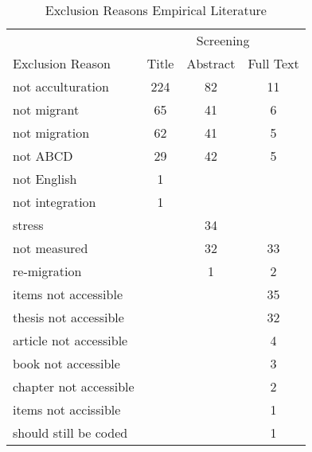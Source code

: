\begin{table}
\begin{minipage}[t][\textheight][t]{\textwidth}

\caption{\label{tab:EmpiricalExclusion}Exclusion Reasons Empirical Literature}
\begin{tabular}[t]{lccc}
\toprule
\multicolumn{1}{c}{ } & \multicolumn{3}{c}{Screening} \\
\cmidrule(l{3pt}r{3pt}){2-4}
Exclusion Reason & Title & Abstract & Full Text\\
\midrule
not acculturation & 224 & 82 & 11\\
not migrant & 65 & 41 & 6\\
not migration & 62 & 41 & 5\\
not ABCD & 29 & 42 & 5\\
not English & 1 &  & \\
not integration & 1 &  & \\
stress &  & 34 & \\
not measured &  & 32 & 33\\
re-migration &  & 1 & 2\\
items not accessible &  &  & 35\\
thesis not accessible &  &  & 32\\
article not accessible &  &  & 4\\
book not accessible &  &  & 3\\
chapter not accessible &  &  & 2\\
items not accissible &  &  & 1\\
should still be coded &  &  & 1\\
\bottomrule
\end{tabular}
\end{minipage}
\end{table}
